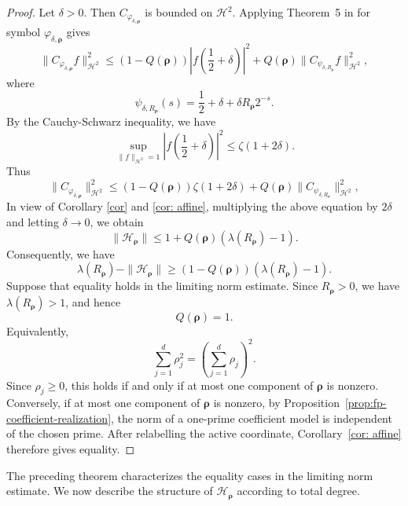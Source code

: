 \documentclass[12pt, reqno]{amsart}
\numberwithin{equation}{section}
\begin{document}
\begin{proof}
    Let $\delta>0.$ Then $C_{\varphi_{\delta,\boldsymbol\rho}}$ is bounded on $\mathcal{H}^2$. Applying  Theorem~5 in \cite{BP1} for symbol $\varphi_{\delta,\boldsymbol\rho}$ gives
\[
\|C_{\varphi_{\delta,\boldsymbol\rho}}f\|_{\mathcal H^2}^2
\leq
(1-Q(\boldsymbol\rho))
\left|
f\left(\frac12+\delta\right)
\right|^2
+
Q(\boldsymbol\rho)
\|C_{\psi_{\delta,R_{\boldsymbol\rho}}}f\|_{\mathcal H^2}^2,
\]
where \[
\psi_{\delta,R_{\boldsymbol{\rho}}}(s)
=
\frac12+\delta+\delta R_{\boldsymbol{\rho}}2^{-s}.
\]
By the Cauchy-Schwarz inequality, we have $$\sup_{\|f\|_{\mathcal{H}^2}=1}\left|
f\left(\frac12+\delta\right)
\right|^2\leq \zeta(1+2\delta).$$
Thus
\[
\|C_{\varphi_{\delta,\boldsymbol\rho}}\|_{\mathcal H^2}^2
\leq
(1-Q(\boldsymbol\rho))
\zeta(1+2\delta)
+
Q(\boldsymbol\rho)
\|C_{\psi_{\delta,R_{\boldsymbol\rho}}}\|_{\mathcal H^2}^2,
\]
In view of Corollary \ref{cor} and \ref{cor: affine}, multiplying  the above equation by $2\delta$ and letting   $\delta \to 0$, we obtain
\[
\|\mathcal H_{\boldsymbol\rho}\|
\leq
1+
Q(\boldsymbol\rho)
\left(
\lambda(R_{\boldsymbol\rho})-1
\right).
\]
Consequently, we have
\[
\lambda(R_{\boldsymbol\rho})
-
\|\mathcal H_{\boldsymbol\rho}\|
\geq
\left(1-Q(\boldsymbol\rho)\right)
\left(\lambda(R_{\boldsymbol\rho})-1\right).
\]
Suppose that equality holds in the limiting norm estimate. Since
$R_{\boldsymbol\rho}>0$, we have
$\lambda(R_{\boldsymbol\rho})>1$, and hence
\[
Q(\boldsymbol\rho)=1.
\]
Equivalently,
\[
\sum_{j=1}^d\rho_j^2
=
\left(\sum_{j=1}^d\rho_j\right)^2.
\]
Since $\rho_j\ge0$, this holds if and only if at most one component of
$\boldsymbol\rho$ is nonzero. Conversely, if at most one component of
$\boldsymbol\rho$ is nonzero,
by  Proposition~\ref{prop:fp-coefficient-realization}, the norm of a one-prime coefficient model is independent of the chosen prime. After
relabelling the active coordinate, Corollary~\ref{cor: affine} therefore
gives equality.
\end{proof}

The preceding theorem characterizes the equality cases in the limiting
norm estimate. We now describe the structure of
$\mathcal H_{\boldsymbol\rho}$ according to total degree.
\end{document}
